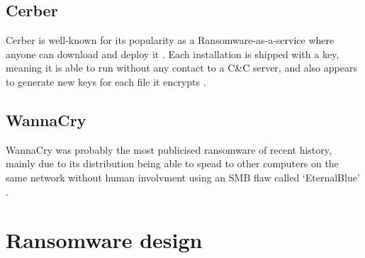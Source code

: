\documentclass[12pt]{article}
\begin{document}
  \subsection{Cerber}
    Cerber is well-known for its popularity as a Ransomware-as-a-service where anyone can download and deploy it \citep{barkly2017cerber}. Each installation is shipped with a key, meaning it is able to run without any contact to a C\&C server, and also appears to generate new keys for each file it encrypts \citep{malwarebytes2016cerber}.

  \subsection{WannaCry}
    WannaCry was probably the most publicised ransomware of recent history, mainly due to its distribution being able to spead to other computers on the same network without human involvment using an SMB flaw called ‘EternalBlue’ \citep{symnatec2017wannacry}.

\section{Ransomware design}

\newpage



\end{document}
